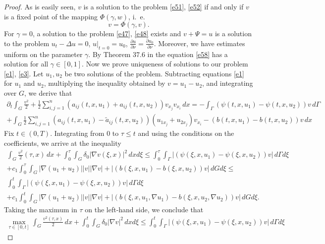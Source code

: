 \documentclass{article}
\theoremstyle{plain}
\begin{document}
\begin{proof}
As is easily seen,  $v$ is a solution to the problem  \eqref{e51}, \eqref{e52} if and only if  $v$ is a fixed point of the mapping 
$\Phi(\gamma,w)$, i.~e. 
\begin{equation}\label{e58}
	v=\Phi(\gamma,v).  
\end{equation}
For  $\gamma=0$, a solution to the problem  \eqref{e47}, \eqref{e48} exists and  $v+\Psi=u$ is a solution to the problem   $u_t-\Delta u=0$, $u|_{t=0}=u_0$,
$\frac{\partial u}{\partial \nu}=\frac{\partial u_0}{\partial \nu}$. 
Moreover, we have estimates uniform on the parameter  $\gamma$. By Theorem  37.6 in \cite{kra}
the equation  \eqref{e58} has a solution for all $\gamma\in [0,1]$. 
Now we prove uniqueness of solutions to our problem 
{\rm \eqref{e1}, \eqref{e3}}. Let  $u_1,u_2$ be two solutions of the problem. Subtracting equations  \eqref{e1} for $u_1$ and $u_2$, multiplying 
the inequality obtained  by 
$v=u_1-u_2$, and integrating over  $G$, we derive that 
\begin{multline}\label{e59}
\partial_t \int_G \frac{v^2}{2} +
\frac{1}{2}\sum_{i,j=1}^n (a_{ij}(t,x,u_1)+ a_{ij}(t,x,u_2)) v_{x_j}v_{x_i}\,dx  =-\int_{\Gamma}(\psi(t,x,u_1)-\psi(t,x,u_2))v\,d\Gamma
\\ + \int_G\frac{1}{2}\sum_{i,j=1}^n ({a}_{ij}(t,x,u_1)- \tilde{a}_{ij}(t,x,u_2))(u_{1x_j}+u_{2x_j})v_{x_i}  -(b(t,x,u_1)-b(t,x,u_2))v\,dx
\end{multline}
Fix  $t\in (0,T)$.
Integrating  from 0 to  $\tau\leq t$ and using the conditions on the coefficients, we arrive at the inequality
\begin{multline}\label{e60}
\int_G \frac{v^2}{2}(\tau,x) \,dx+ \int_0^\tau\int_G\delta_0|\nabla v(\xi,x)|^2\,dxd\xi \leq
\int_0^\tau \int_{\Gamma}|(\psi(\xi,x,u_1)-\psi(\xi,x,u_2))v|\,d\Gamma d\xi
\\ + c_1\int_0^\tau\int_G|\nabla (u_{1}+u_{2})| |v||\nabla v| +|(b(\xi,x,u_1)-b(\xi,x,u_2))v|\,dGd\xi\leq \\
 \int_0^t \int_{\Gamma}|(\psi(\xi,x,u_1)-\psi(\xi,x,u_2))v|\,d\Gamma d\xi \\
+ c_1\int_0^t\int_G|\nabla (u_{1}+u_{2})| |v||\nabla v| +|(b(\xi,x,u_1,\nabla u_1)-b(\xi,x,u_2,\nabla u_2))v|\,dGd\xi.
\end{multline}
Taking the maximum in  $\tau$ on the left-hand side, we conclude that  
\begin{multline}\label{e61}
 \max_{\tau\in [0,t]}\int_G \frac{v^2(\tau,x)}{2} \,dx+ \int_0^t\int_G\delta_0|\nabla v|^2\,dxd\xi\leq
\int_0^t \int_{\Gamma}|(\psi(\xi,x,u_1)-\psi(\xi,x,u_2))v|\,d\Gamma d\xi

\end{multline}
\end{proof}
\end{document}
